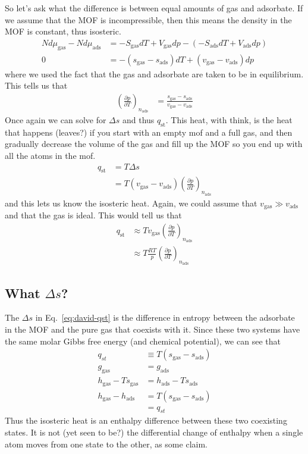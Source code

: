 \documentclass[letterpaper,twocolumn,amsmath,amssymb,jcp,aps,10pt]{revtex4-1}
\begin{document}
So let's ask what the difference is between equal amounts of gas and
adsorbate.  If we assume that the MOF is incompressible, then this
means the density in the MOF is constant, thus isosteric.
\begin{align}
  Nd\mu_\text{gas} - Nd\mu_\text{ads} &= -S_\text{gas}dT +
  V_\text{gas}dp
  - \left(-S_\text{ads}dT + V_\text{ads}dp\right)
  \\
  0 &= -(s_\text{gas} - s_\text{ads})dT + (v_\text{gas}-v_\text{ads})dp
\end{align}
where we used the fact that the gas and adsorbate are taken to be in
equilibrium.  This tells us that
\begin{align}
  \left(\frac{\partial p}{\partial T}\right)_{n_\text{ads}}
  &= \frac{s_\text{gas} - s_\text{ads}}{v_\text{gas}-v_\text{ads}}
\end{align}
Once again we can solve for $\Delta s$ and thus $q_\text{st}$.  This
heat, with think, is the heat that happens (leaves?) if you start with
an empty mof and a full gas, and then gradually decrease the volume of
the gas and fill up the MOF so you end up with all the atoms in the
mof.
\begin{align}
  q_\text{st} &= T\Delta s \label{eq:david-qst}
  \\
  &= T(v_\text{gas}-v_\text{ads})
  \left(\frac{\partial p}{\partial T}\right)_{n_\text{ads}}
\end{align}
and this lets us know the isosteric heat.  Again, we could assume that
$v_\text{gas}\gg v_\text{ads}$ and that the gas is ideal.  This would
tell us that
\begin{align}
  q_\text{st} &\approx
  Tv_\text{gas}\left(\frac{\partial p}{\partial
    T}\right)_{n_\text{ads}}
  \\
  &\approx T\frac{RT}{p}\left(\frac{\partial p}{\partial
    T}\right)_{n_\text{ads}}
\end{align}

\subsection{What $\Delta s$?}
The $\Delta s$ in Eq.~\ref{eq:david-qst} is the difference in entropy between the adsorbate in the MOF and the pure gas that coexists with it.  Since these two systems have the same molar Gibbs free energy (and chemical potential), we can see that
\begin{align}
    q_{st} &\equiv T(s_\text{gas} - s_\text{ads}) \\
    g_\text{gas} &= g_\text{ads} \\
    h_\text{gas} - Ts_\text{gas} &= h_\text{ads} - Ts_\text{ads} \\
    h_\text{gas} - h_\text{ads} &= T(s_\text{gas} - s_\text{ads})
    \\
    &= q_{st}
\end{align}
Thus the isosteric heat is an enthalpy difference between these two coexisting states.  It is not (yet seen to be?) the differential change of enthalpy when a single atom moves from one state to the other, as some claim.
\end{document}
